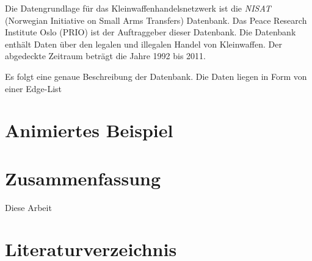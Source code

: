 \documentclass[a4paper,ngerman,oneside,titlepage,11pt]{scrreprt}
\theoremstyle{remark}
\begin{document}
Die Datengrundlage für das Kleinwaffenhandelsnetzwerk ist die \emph{NISAT} (Norwegian Initiative on Small Arms Transfers) Datenbank. Das Peace Research Institute Oslo (PRIO) ist der Auftraggeber dieser Datenbank. Die Datenbank enthält Daten über den legalen und illegalen Handel von Kleinwaffen. Der abgedeckte Zeitraum beträgt die Jahre 1992 bis 2011.

Es folgt eine genaue Beschreibung der Datenbank. Die Daten liegen in Form von einer Edge-List



\chapter{Animiertes Beispiel}



\chapter{Zusammenfassung}

Diese Arbeit 

 



% 
% 
% 
% 
%


\chapter*{Literaturverzeichnis}


\end{document}
